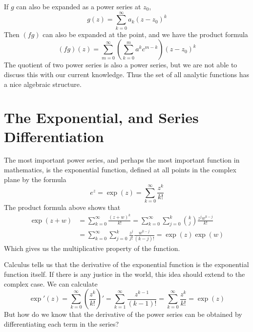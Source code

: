 If $g$ can also be expanded as a power series at $z_0$,
%
\[ g(z) = \sum_{k = 0}^\infty a_k (z - z_0)^k \]
%
Then $(fg)$ can also be expanded at the point, and we have the product formula
%
\[ (fg)(z) = \sum_{m = 0}^\infty \left( \sum_{k = 0}^m a^kc^{m-k} \right) (z - z_0)^k \]
%
The quotient of two power series is also a power series, but we are not able to discuss this with our current knowledge. Thus the set of all analytic functions has a nice algebraic structure.

\section{The Exponential, and Series Differentiation}

The most important power series, and perhaps the most important function in mathematics, is the exponential function, defined at all points in the complex plane by the formula
%
\[ e^z = \exp(z) = \sum_{k = 0}^\infty \frac{z^k}{k!} \]
%
The product formula above shows that
%
\begin{align*}
    \exp(z + w) &= \sum_{k = 0}^\infty \frac{(z + w)^k}{k!} = \sum_{k = 0}^\infty \sum_{j = 0}^k \binom{k}{j} \frac{z^j w^{k-j}}{k!}\\
    &= \sum_{k = 0}^\infty \sum_{j = 0}^k \frac{z^j}{j!} \frac{w^{k-j}}{(k - j)!} = \exp(z) \exp(w)
\end{align*}
%
Which gives us the multiplicative property of the function.

Calculus tells us that the derivative of the exponential function is the exponential function itself. If there is any justice in the world, this idea should extend to the complex case. We can calculate
%
\[ \exp'(z) = \sum_{k = 0}^\infty \left( \frac{z^k}{k!} \right)' = \sum_{k = 1}^\infty \frac{z^{k-1}}{(k-1)!} = \sum_{k = 0}^\infty \frac{z^k}{k!} = \exp(z) \]
%
But how do we know that the derivative of the power series can be obtained by differentiating each term in the series?

